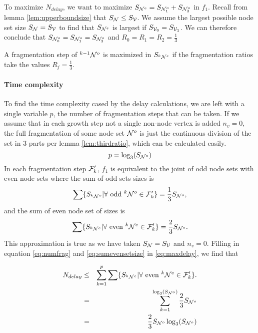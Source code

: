 To maximize $N_{delay}$, we want to maximize $S_{\mathcal{N}^e} = S_{\mathcal{N}^o_1} + S_{\mathcal{N}^o_2}$ in $f_1$. Recall from lemma \ref{lem:upperboundsize} that $S_{\mathcal{N}} \leq S_{\mathcal{V}}$. We assume the largest possible node set size $S_{\mathcal{N}} = S_{\mathcal{V}}$ to find that $ S_{\mathcal{N}^e} $ is largest if $S_{\mathcal{V}_0} = S_{\mathcal{V}_1}$. We can therefore conclude that $S_{\mathcal{N}^o_0} = S_{\mathcal{N}^o_1} = S_{\mathcal{N}^o_2}$ and $R_0 = R_1 = R_2 = \frac{1}{3}$

\begin{lemma}\label{lem:thirdratio}
  A fragmentation step of ${}^{k-1}\mathcal{N}^o$ is maximized in $S_{{}^{k}\mathcal{N}^e}$ if the fragmentation ratios take the values $R_j = \frac{1}{3}$.
\end{lemma}

\paragraph{Time complexity}

To find the time complexity cased by the delay calculations, we are left with a single variable $p$, the number of fragmentation steps that can be taken. If we assume that in each growth step not a single non-node vertex is added $n_v = 0$, the full fragmentation of some node set $\mathcal{N}^o$ is just the continuous division of the set in 3 parts per lemma \ref{lem:thirdratio}, which can be calculated easily.
\begin{equation}\label{eq:numfrag}
  p = \log_3(S_{\mathcal{N}^o})
\end{equation}
In each fragmentation step $\mathcal{F}'_k$, $f_1$ is equivalent to the joint of odd node sets with even node sets where the sum of odd sets sizes is
\begin{equation}\label{eq:sumoddsetsize}
  \sum \{ S_{{}^{k}\mathcal{N}^o} | \forall \mbox{ odd } {}^{k}\mathcal{N}^o \in \mathcal{F}'_k \} = \frac{1}{3}S_{\mathcal{N}^o},
\end{equation}
and the sum of even node set of sizes is
\begin{equation}\label{eq:sumevensetsize}
  \sum \{ S_{{}^{k}\mathcal{N}^e} | \forall \mbox{ even } {}^{k}\mathcal{N}^e \in \mathcal{F}'_k \} = \frac{2}{3}S_{\mathcal{N}^o}.
\end{equation}
This approximation is true as we have taken $S_{\mathcal{N}} = S_{\mathcal{V}}$ and $n_v=0$. Filling in equation \ref{eq:numfrag} and \ref{eq:sumevensetsize} in \ref{eq:maxdelay}, we find that

\begin{eqnarray}
\nonumber  N_{delay} &\leq& \sum_{k=1}^{p} \sum \{ S_{{}^{k}\mathcal{N}^e} | \forall \mbox{ even } {}^{k}\mathcal{N}^e \in \mathcal{F}'_k \}. \\
\nonumber   &=& \sum_{k=1}^{\log_3(S_{\mathcal{N}^o})} \frac{2}{3}S_{\mathcal{N}^o} \\
   &=& \frac{2}{3}S_{\mathcal{N}^o}\log_3(S_{\mathcal{N}^o})
\end{eqnarray}

